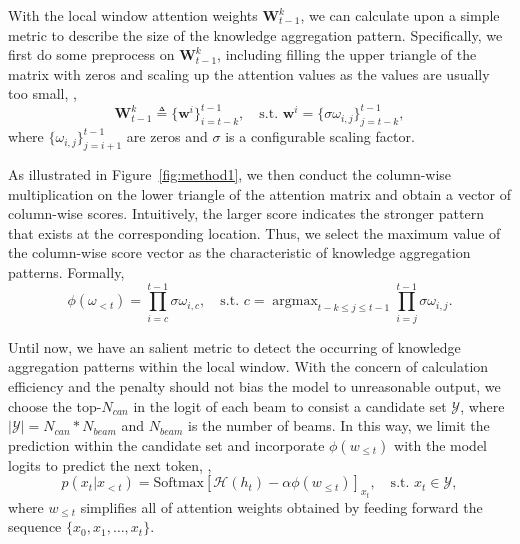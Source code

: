 \documentclass[10pt,twocolumn,letterpaper]{article}
\newcommand{\Fref}[1]{Figure~\ref{#1}}
\begin{document}
With the local window attention weights $\mathbf{W}_{t-1}^k$, we can calculate upon a simple metric to describe the size of the knowledge aggregation pattern. 
Specifically, we first do some preprocess on $\mathbf{W}_{t-1}^k$, including filling the upper triangle of the matrix with zeros and scaling up the attention values as the values are usually too small, \ie, 
\begin{equation}
    \mathbf{W}_{t-1}^k\triangleq\{\mathbf{w}^i\}_{i=t-k}^{t-1},
    \quad\text{s.t. }\mathbf{w}^i=\{\sigma\omega_{i,j}\}_{j=t-k}^{t-1},  
\end{equation}
where $\{\omega_{i,j}\}_{j=i+1}^{t-1}$ are zeros and $\sigma$ is a configurable scaling factor. 


As illustrated in \Fref{fig:method1}, we then conduct the column-wise multiplication on the lower triangle of the attention matrix and obtain a vector of column-wise scores. 
Intuitively, the larger score indicates the stronger pattern that exists at the corresponding location. 
Thus, we select the maximum value of the column-wise score vector as the characteristic of knowledge aggregation patterns. 
Formally, 
\begin{equation}
\label{eq:4}
    \phi(\omega_{<t}) = \mathop{\prod}_{i=c}^{t-1}\sigma\omega_{i,c}, \quad\text{s.t. } c=\mathop{\arg\max}_{t-k\leq j\leq t-1}\mathop{\prod}_{i=j}^{t-1}\sigma\omega_{i,j}.
\end{equation}


Until now, we have an salient metric to detect the occurring of knowledge aggregation patterns within the local window. 
With the concern of calculation efficiency and the penalty should not bias the model to unreasonable output, we choose the top-$N_{can}$ in the logit of each beam to consist a candidate set $\mathcal{Y}$, where $|\mathcal{Y}|=N_{can}*N_{beam}$ and $N_{beam}$ is the number of beams. 
In this way, we limit the prediction within the candidate set and incorporate $\phi(w_{\leq t})$ with the model logits to predict the next token, \ie, 
\begin{equation}
    p(x_t|x_{<t}) = \text{Softmax}[\mathcal{H}(h_t) - \alpha\phi(w_{\leq t})]_{x_t}, \quad\text{s.t. } x_t\in \mathcal{Y},
\end{equation}
where $w_{\leq t}$ simplifies all of attention weights obtained by feeding forward the sequence $\{x_0,x_1,\ldots,x_t\}$.
\end{document}
